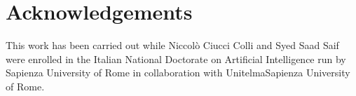 \section{Acknowledgements}

This work has been carried out while Niccolò Ciucci Colli and Syed Saad Saif were enrolled in the Italian National Doctorate on Artificial Intelligence run by Sapienza University of Rome in collaboration with UnitelmaSapienza University of Rome.
